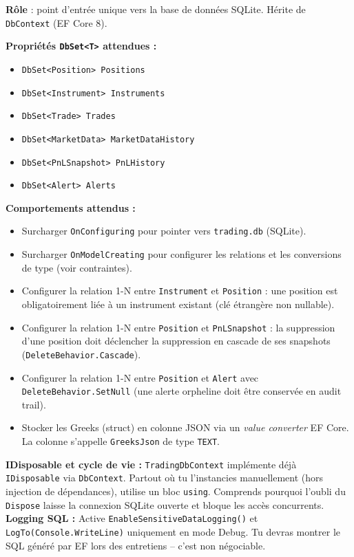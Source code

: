 \documentclass[a4paper,11pt]{article}
\newcommand{\cs}[1]{\texttt{\color{codeinline}#1}}
\begin{document}
\textbf{Rôle} : point d'entrée unique vers la base de données SQLite. Hérite de
\cs{DbContext} (EF Core 8).

\textbf{Propriétés \cs{DbSet<T>} attendues :}
\begin{itemize}
  \item \cs{DbSet<Position> Positions}
  \item \cs{DbSet<Instrument> Instruments}
  \item \cs{DbSet<Trade> Trades}
  \item \cs{DbSet<MarketData> MarketDataHistory}
  \item \cs{DbSet<PnLSnapshot> PnLHistory}
  \item \cs{DbSet<Alert> Alerts}
\end{itemize}

\textbf{Comportements attendus :}
\begin{itemize}
  \item Surcharger \cs{OnConfiguring} pour pointer vers \texttt{trading.db} (SQLite).
  \item Surcharger \cs{OnModelCreating} pour configurer les relations et les
        conversions de type (voir contraintes).
  \item Configurer la relation 1-N entre \cs{Instrument} et \cs{Position} :
        une position est obligatoirement liée à un instrument existant (clé étrangère
        non nullable).
  \item Configurer la relation 1-N entre \cs{Position} et \cs{PnLSnapshot} :
        la suppression d'une position doit déclencher la suppression en cascade de
        ses snapshots (\cs{DeleteBehavior.Cascade}).
  \item Configurer la relation 1-N entre \cs{Position} et \cs{Alert} avec
        \cs{DeleteBehavior.SetNull} (une alerte orpheline doit être conservée en
        audit trail).
  \item Stocker les Greeks (struct) en colonne JSON via un \emph{value converter}
        EF Core. La colonne s'appelle \cs{GreeksJson} de type \cs{TEXT}.
\end{itemize}

\begin{tcolorbox}[constraint]
\textbf{IDisposable et cycle de vie :} \cs{TradingDbContext} implémente déjà
\cs{IDisposable} via \cs{DbContext}. Partout où tu l'instancies manuellement
(hors injection de dépendances), utilise un bloc \cs{using}. Comprends pourquoi
l'oubli du \cs{Dispose} laisse la connexion SQLite ouverte et bloque les accès
concurrents. \\[4pt]
\textbf{Logging SQL :} Active \cs{EnableSensitiveDataLogging()} et
\cs{LogTo(Console.WriteLine)} uniquement en mode Debug. Tu devras montrer le SQL
généré par EF lors des entretiens -- c'est non négociable.
\end{tcolorbox}
\end{document}
